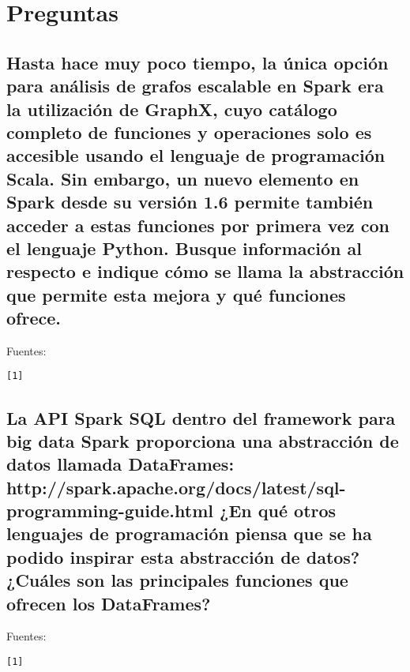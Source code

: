 \documentclass[12pt,a4paper,twoside,openright,titlepage,final]{article}
\author{José Ignacio Escribano}
\title{}
\begin{document}
\setcounter{page}{1}


\tableofcontents
\thispagestyle{empty}
\newpage

\setcounter{page}{1}


\section{Preguntas}

\subsection{Hasta hace muy poco tiempo, la única opción para análisis de grafos escalable en Spark era la utilización de GraphX, cuyo catálogo completo de funciones y operaciones solo es accesible usando el lenguaje de programación Scala. Sin embargo, un nuevo elemento en Spark desde su versión 1.6 permite también acceder a estas funciones por primera vez con el lenguaje Python. Busque información al respecto e indique cómo se llama la abstracción que permite esta mejora y qué funciones ofrece.}



Fuentes:\\
\begin{verbatim}
[1] 
\end{verbatim}

\subsection{La API Spark SQL dentro del framework para big data Spark proporciona una abstracción de datos llamada DataFrames: http://spark.apache.org/docs/latest/sql-programming-guide.html ¿En qué otros lenguajes de programación piensa que se ha podido inspirar esta abstracción de datos? ¿Cuáles son las principales funciones que ofrecen los DataFrames?}

Fuentes:\\
\begin{verbatim}
[1]
\end{verbatim}
\end{document}
